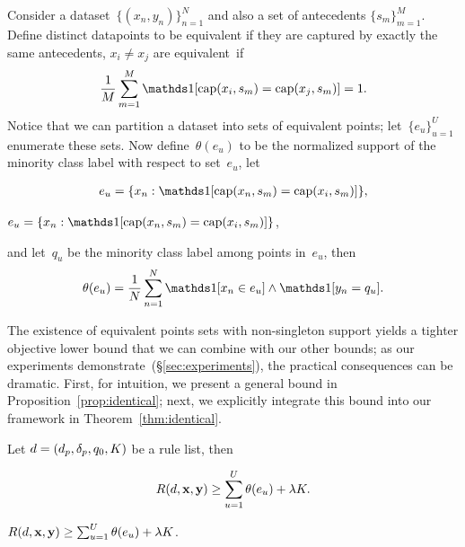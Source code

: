 Consider a dataset~${\{(x_n, y_n)\}_{n=1}^N}$ and also a set of antecedents
${\{s_m\}_{m=1}^M}$.
%
Define distinct datapoints to be equivalent if they are captured by
exactly the same antecedents, \ie ${x_i \neq x_j}$ are equivalent~if
\begin{align}
\frac{1}{M} \sum_{m=1}^M \one [ \Cap(x_i, s_m) = \Cap(x_j, s_m) ] = 1.
\end{align}
Notice that we can partition a dataset into sets of equivalent points;
let~${\{e_u\}_{u=1}^U}$ enumerate these sets.
%
Now define~$\theta(e_u)$ to be the normalized support of the minority
class label with respect to set~$e_u$, \eg let
\begin{arxiv}
\begin{align}
{e_u = \{x_n : \one [ \Cap(x_n, s_m) = \Cap(x_i, s_m) ] \}},
\end{align}
\end{arxiv}
\begin{kdd}
${e_u = \{x_n : \one [ \Cap(x_n, s_m) = \Cap(x_i, s_m) ] \}}$,
\end{kdd}
and let~$q_u$ be the minority class label among points in~$e_u$, then
\begin{align}
\theta(e_u) = \frac{1}{N} \sum_{n=1}^N \one [ x_n \in e_u ] \wedge \one [ y_n = q_u ].
\label{eq:theta}
\end{align}

The existence of equivalent points sets with non-singleton support
yields a tighter objective lower bound that we can combine with our other bounds;
as our experiments demonstrate~(\S\ref{sec:experiments}),
the practical consequences can be dramatic.
%
First, for intuition, we present a general bound in
Proposition~\ref{prop:identical}; next, we explicitly integrate
this bound into our framework in Theorem~\ref{thm:identical}.

\begin{proposition}
\label{prop:identical}
Let ${{d} = (d_p, \delta_p, q_0, K)}$ be a rule list, then
\begin{arxiv}
\begin{align}
R({d}, \mathbf{x}, \mathbf{y}) \ge \sum_{u=1}^U \theta(e_u) + {\lambda} K.
\end{align}
\end{arxiv}
\begin{kdd}
${R({d}, \mathbf{x}, \mathbf{y}) \ge \sum_{u=1}^U \theta(e_u) + {\lambda} K}$.
\end{kdd}
\end{proposition}

